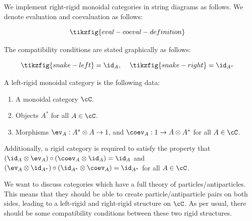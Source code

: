 We implement right-rigid monoidal categories in string diagrams as follows. We denote evaluation and coevaluation as follows:

\begin{equation*}
\tikzfig{eval-coeval-definition}
\end{equation*}

The compatibility conditions are stated graphically as follows:

\begin{equation*}
\tikzfig{snake-left} = \id_A,\,\,\,\,\,\,\, \tikzfig{snake-right} = \id_{A^*}
\end{equation*}

\begin{defn} A left-rigid monoidal category is the following data:

\begin{enumerate}
\item A monoidal category $\cC$.
\item Objects $A^*$ for all $A\in \cC$.
\item Morphisms $\ev_{A}: A^*\otimes A\to 1$, and $\coev_{A}: 1\to A\otimes A^*$ for all $A\in \cC$.
\end{enumerate}

Additionally, a rigid category is required to satisfy the property that $(\id_A\otimes\ev_A)\circ (\coev_A\otimes \id_A)=\id_A$ and $(\ev_A\otimes \id_{A^*})\circ (\id_{A^*}\otimes \coev_{A})=\id_{A^*}$ for all $A\in \cC$. 


\end{defn}

\begin{rem} We want to discuss categories which have a full theory of particles/antiparticles. This means that they should be able to create particle/antiparticle pairs on both sides, leading to a left-rigid and right-rigid structure on $\cC$. As per usual, there should be some compatibility conditions between these two rigid structures.
\end{rem}

